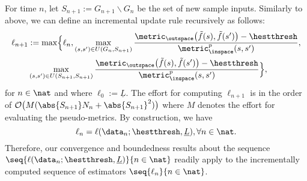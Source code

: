 For time $n$, let $S_{n+1} := G_{n+1} \backslash G_n$ be the set of new sample inputs.
Similarly to above, we can define an incremental update rule recursively as follows: 
\begin{align} \label{eq:Hoelconstlazyupdateincr}
\ell_{n+1} &:= \max\Bigl\{\ell_n, \max_{(s,s') \in U(G_n, S_{n+1})} \frac{\metric_\outspace\bigl(\tilde f(s),\tilde f(s')\bigr) - \hestthresh}{\metric_{\inspace}^p(s,s')},\\
&\max_{(s,s') \in U(S_{n+1}, S_{n+1})} \frac{\metric_\outspace\bigl(\tilde f(s),\tilde f(s')\bigr) - \hestthresh}{\metric_{\inspace}^p(s,s')} \Bigr\},
\end{align} for $n \in \nat$ 
and where 
$\ell_0 := \underline L$. 
The effort for computing $\ell_{n+1}$ is in the order of $\mathcal O\bigl(M (\abs{S_{n+1}} N_n+ \abs{S_{n+1}}^2)\bigr)$ where $M$ denotes the effort for evaluating the pseudo-metrics.
By construction, we have \[\ell_n =\ell(\data_n;\hestthresh,\underline L), \forall n \in \nat.\] Therefore, our convergence and boundedness results about the sequence
 $\seq{\ell(\data_n;\hestthresh,\underline L)}{n \in \nat}$ readily apply to the incrementally computed sequence of estimators $\seq{\ell_n}{n \in \nat}$.

